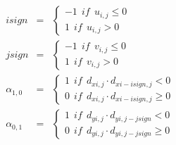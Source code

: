 \begin{eqnarray}
isign &=& \left\{ \begin{array}{ll}
                  -1 \ \ if \ \ u_{i,j} \leq 0 \\
                   1 \ \ if \ \ u_{i,j} > 0
                   \end{array} \right. \\
jsign &=& \left\{ \begin{array}{ll}
                  -1 \ \ if \ \ v_{i,j} \leq 0  \\
                   1 \ \ if \ \ v_{i,j} > 0
                   \end{array} \right.\\
\alpha_{1,0} &=& \left\{ \begin{array}{ll}
                   1 \ \ if \ \ d_{xi,j}\cdot d_{xi-isign,j} < 0 \\
                   0 \ \ if \ \ d_{xi,j}\cdot d_{xi-isign,j} \geq 0
                   \end{array} \right.\\
\alpha_{0,1} &=& \left\{ \begin{array}{ll}
                   1 \ \ if \ \ d_{yi,j}\cdot d_{yi,j-jsign} < 0 \\
                   0 \ \ if \ \ d_{yi,j}\cdot d_{yi,j-jsign} \geq 0
                   \end{array} \right.
\end{eqnarray}


